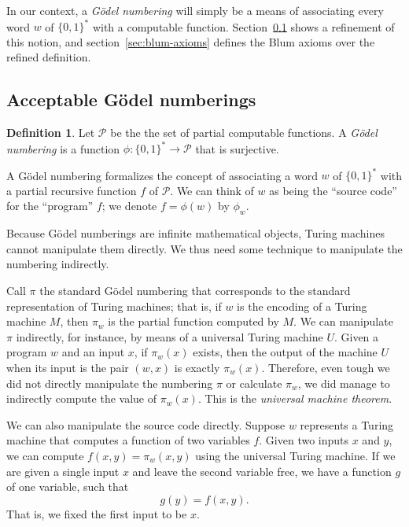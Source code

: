 \documentclass[12pt]{article}
\theoremstyle{definition}
\newtheorem{definition}{Definition}
\begin{document}
In our context,
a \emph{Gödel numbering} will simply be a means
of associating every word $w$ of $\{0, 1\}^*$
with a computable function.
Section~\ref{sec:acceptable-godel-numberings} shows a refinement of this notion,
and section~\ref{sec:blum-axioms}
defines the Blum axioms over the refined definition.

\subsection{Acceptable Gödel numberings}
\label{sec:acceptable-godel-numberings}

\begin{definition}
    Let $\mathcal P$ be the the set of partial computable functions.
    A \emph{Gödel numbering}
    is a function $\phi: \{0, 1\}^* \to \mathcal P$
    that is surjective.
\end{definition}

A Gödel numbering formalizes the concept of associating a word $w$ of $\{0, 1\}^*$
with a partial recursive function $f$ of $\mathcal P$.
We can think of $w$ as being the ``source code'' for the ``program'' $f$;
we denote $f = \phi(w)$ by $\phi_w$.

Because Gödel numberings are infinite mathematical objects,
Turing machines cannot manipulate them directly.
We thus need some technique to manipulate the numbering indirectly.

Call $\pi$ the standard Gödel numbering
that corresponds to the standard representation of Turing machines;
that is, if $w$ is the encoding of a Turing machine $M$,
then $\pi_w$ is the partial function computed by $M$.
We can manipulate $\pi$ indirectly, for instance,
by means of a universal Turing machine $U$.
Given a program $w$ and an input $x$,
if $\pi_w(x)$ exists,
then the output of the machine $U$ when its input is the pair $(w, x)$
is exactly $\pi_w(x)$.
Therefore,
even tough we did not directly manipulate the numbering $\pi$
or calculate $\pi_w$,
we did manage to indirectly compute the value of $\pi_w(x)$.
This is the \emph{universal machine theorem}.

We can also manipulate the source code directly.
Suppose $w$ represents a Turing machine that computes a function of two variables $f$.
Given two inputs $x$ and $y$, we can compute $f(x, y) = \pi_w(x, y)$
using the universal Turing machine.
If we are given a single input $x$ and leave the second variable free,
we have a function $g$ of one variable, such that
\begin{equation*}
    g(y) = f(x, y).
\end{equation*}
That is, we fixed the first input to be $x$.
\end{document}
